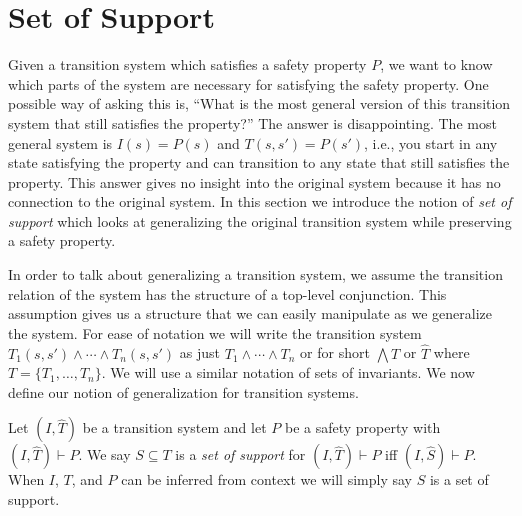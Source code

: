 \section{Set of Support}
\label{sec:support}

\newcommand{\bq}{\textsc{BaseQuery}\xspace}
\newcommand{\iq}{\textsc{InductiveQuery}\xspace}
\newcommand{\fq}{\textsc{FullQuery}\xspace}

\newcommand{\mink}{\textsc{MinimizeK}\xspace}
\newcommand{\reduceinv}{\textsc{ReduceInvariants}\xspace}
\newcommand{\minsupport}{\textsc{MinimizeSupport}\xspace}

\newcommand{\checksat}{\textsc{CheckSat}\xspace}
\newcommand{\unsatcore}{\textsc{UnsatCore}\xspace}
\newcommand{\unsat}{\textsc{UNSAT}\xspace}
\newcommand{\sat}{\textsc{SAT}\xspace}

Given a transition system which satisfies a safety property $P$, we
want to know which parts of the system are necessary for satisfying
the safety property. One possible way of asking this is, ``What is the
most general version of this transition system that still satisfies
the property?'' The answer is disappointing. The most general system is
$I(s) = P(s)$ and $T(s, s') = P(s')$, i.e., you start in any state
satisfying the property and can transition to any state that still
satisfies the property. This answer gives no insight into the original
system because it has no connection to the original system. In this
section we introduce the notion of {\em set of support} which looks at
generalizing the original transition system while preserving a safety
property.

In order to talk about generalizing a transition system, we assume the
transition relation of the system has the structure of a top-level
conjunction. This assumption gives us a structure that we can easily
manipulate as we generalize the system. For ease of notation we will
write the transition system $T_1(s, s') \land \cdots \land T_n(s, s')$
as just $T_1 \land \cdots \land T_n$ or for short $\bigwedge T$ or
$\widehat T$ where $T = \{T_1, \ldots, T_n\}$. We will use a similar
notation of sets of invariants. We now define our notion of
generalization for transition systems.

\begin{definition}
  \label{def:set-of-support}
  Let $(I, \widehat T)$ be a transition system and let $P$ be a
  safety property with $(I, \widehat T)\vdash P$. We say $S \subseteq
  T$ is a {\em set of support} for $(I, \widehat T)\vdash P$ iff $(I,
  \widehat S) \vdash P$. When $I$, $T$, and $P$ can be inferred from
  context we will simply say $S$ is a set of support.
\end{definition}


